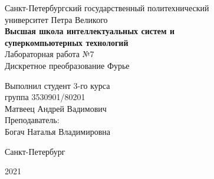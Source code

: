 \documentclass[a4paper]{article}
\begin{document}
    \begin{center}
        \begin{center}
        \hfill \break
        \normalsize{Санкт-Петербургский государственный политехнический}\\
        \normalsize{университет Петра Великого}\\
        \hfill \break
        \normalsize{\textbf{Высшая школа интеллектуальных систем и}}\\ 
        \normalsize{\textbf{суперкомпьютерных технологий}}\\ 
        \hfill \break
        \hfill \break
        \hfill \break
        \normalsize{Лабораторная работа №7}\\
        \hfill \break
        \hfill \break
        \normalsize{\LARGE Дискретное преобразование Фурье}\\
        \end{center}
        \hfill \break
        \hfill \break
        \hfill \break
        \hfill \break
        \hfill \break
        \hfill \break
        \hfill \break
        \hfill \break
        \hfill \break
        \hfill \break
        \begin{flushright}
            \normalsize{Выполнил студент 3-го курса}\\
            \normalsize{группа 3530901/80201}\\
            \normalsize{Матвеец Андрей Вадимович}\\
            \hfill \break
            \normalsize{Преподаватель:}\\
            \normalsize{Богач Наталья Владимировна}\\
        \end{flushright}
        \hfill \break
        \hfill \break
        \hfill \break
        \hfill \break
        \begin{center} Санкт-Петербург\end{center}
        \begin{center}2021\end{center} 
        \thispagestyle{empty}
    \end{center}
    
    \newpage
        \tableofcontents
    
    \newpage
         \listoffigures
    
    \newpage
         \lstlistoflistings   
     
\end{document}
